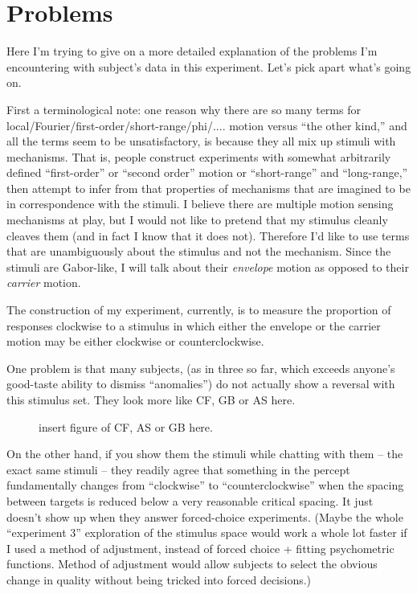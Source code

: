 \documentclass[english,noae]{article}
\makeatletter
\newenvironment{lyxgreyedout}
  {\textcolor{note_fontcolor}\bgroup\ignorespaces}
  {\ignorespacesafterend\egroup}
\def\maxwidth{%
\ifdim\Gin@nat@width>\linewidth
\linewidth
\else
\Gin@nat@width
\fi
}
\makeatother
\begin{document}
\section{Problems}



\setkeys{Gin}{width=\maxwidth}

Here I'm trying to give on a more detailed explanation of the problems
I'm encountering with subject's data in this experiment. Let's pick
apart what's going on.

First a terminological note: one reason why there are so many terms
for local/Fourier/first-order/short-range/phi/.... motion versus ``the
other kind,'' and all the terms seem to be unsatisfactory, is because
they all mix up stimuli with mechanisms\citep{Cavanagh:1991fk}. That
is, people construct experiments with somewhat arbitrarily defined
``first-order'' or ``second order'' motion or ``short-range''
and ``long-range,'' then attempt to infer from that properties of
mechanisms that are imagined to be in correspondence with the stimuli.
I believe there are multiple motion sensing mechanisms at play, but
I would not like to pretend that my stimulus cleanly cleaves them
(and in fact I know that it does not). Therefore I'd like to use terms
that are unambiguously about the stimulus and not the mechanism. Since
the stimuli are Gabor-like, I will talk about their \emph{envelope}
motion as opposed to their \emph{carrier} motion.

The construction of my experiment, currently, is to measure the proportion
of responses clockwise to a stimulus in which either the envelope
or the carrier motion may be either clockwise or counterclockwise. 

One problem is that many subjects, (as in three so far, which exceeds
anyone's good-taste ability to dismiss ``anomalies'') do not actually
show a reversal with this stimulus set. They look more like CF, GB
or AS here.

\begin{figure}[h]
\caption{insert figure of CF, AS or GB here.}
\end{figure}


On the other hand, if you show them the stimuli while chatting with
them -- the exact same stimuli -- they readily agree that something
in the percept fundamentally changes from ``clockwise'' to ``counterclockwise''
when the spacing between targets is reduced below a very reasonable
critical spacing. It just doesn't show up when they answer forced-choice
experiments. %
\begin{lyxgreyedout}
(Maybe the whole ``experiment 3'' exploration of the stimulus space
would work a whole lot faster if I used a method of adjustment, instead
of forced choice + fitting psychometric functions. Method of adjustment
would allow subjects to select the obvious change in quality without
being tricked into forced decisions.)%
\end{lyxgreyedout}
\end{document}
